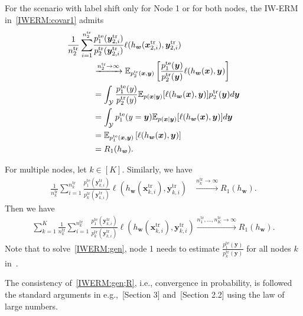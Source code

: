 For the scenario with label shift only for Node 1 or for both nodes, the IW-ERM in~\cref{IWERM:covar1} admits
\begin{align}
\frac{1}{n_2^{\text{tr}}}\sum_{i=1}^{n_2^{\text{tr}}}& \frac{p_1^{\text{te}}(\boldsymbol{y}_{2,i}^{\text{tr}})}{p_2^{\text{tr}}(\boldsymbol{y}_{2,i}^{\text{tr}})}\ell(h_{\boldsymbol{w}}(\boldsymbol{x}_{2,i}^{\text{tr}}),\boldsymbol{y}_{2,i}^{\text{tr}})\\
&\xrightarrow{n_2^{\text{tr}}\rightarrow \infty}
\mathbb{E}_{p_2^{\text{tr}}(\boldsymbol{x},\boldsymbol{y})} \left[\frac{p_1^{\text{te}}(\boldsymbol{y})}{p_2^{\text{tr}}(\boldsymbol{y})}\ell(h_{\boldsymbol{w}}(\boldsymbol{x}),\boldsymbol{y}) \right]\\
&= \int_{\mathcal{Y}}\frac{p_1^{\text{te}}(y)}{p_2^{\text{tr}}(y)}\mathbb{E}_{p(\boldsymbol{x}|\boldsymbol{y})}[\ell(h_{\boldsymbol{w}}(\boldsymbol{x}),\boldsymbol{y})]p_2^{\text{tr}}(\boldsymbol{y}){d}\boldsymbol{y}\\
&= \int_{\mathcal{Y}}p_1^{\text{te}}(y=\boldsymbol{y})\mathbb{E}_{p(\boldsymbol{x}|\boldsymbol{y})}[\ell(h_{\boldsymbol{w}}(\boldsymbol{x}), \boldsymbol{y})]{d}\boldsymbol{y}\\
&= \mathbb{E}_{p_1^{\text{te}}(\boldsymbol{x},\boldsymbol{y})} \left[\ell(h_{\boldsymbol{w}}(\boldsymbol{x}),\boldsymbol{y}) \right]\\
&= R_1(h_{\boldsymbol{w}}). 
\end{align}


For multiple nodes, let $k\in[K]$. Similarly, we have 
\begin{align}
\frac{1}{n_k^{\text{tr}}}\sum_{i=1}^{n_k^{\text{tr}}} \frac{p_1^{\text{te}}(\boldsymbol{y}_{k,i}^{\text{tr}})}{p_k^{\text{tr}}(\boldsymbol{y}_{k,i}^{\text{tr}})}\ell(h_{\boldsymbol{w}}(\boldsymbol{x}_{k,i}^{\text{tr}}),\boldsymbol{y}_{k,i}^{\text{tr}})&\xrightarrow{n_k^{\text{tr}}\rightarrow \infty}
 R_1(h_{\boldsymbol{w}}). 
\end{align}
Then we have 
\begin{align}
    \sum_{k=1}^K \frac{1}{n_k^{\text{tr}}}\sum_{i=1}^{n_k^{\text{tr}}} \frac{p_1^{\text{te}}(\boldsymbol{y}_{k,i}^{\text{tr}})}{p_k^{\text{tr}}(\boldsymbol{y}_{k,i}^{\text{tr}})}\ell(h_{\boldsymbol{w}}(\boldsymbol{x}_{k,i}^{\text{tr}}),\boldsymbol{y}_{k,i}^{\text{tr}})\xrightarrow{n_1^{\text{tr}},\ldots,n_K^{\text{tr}}\rightarrow \infty}
 R_1(h_{\boldsymbol{w}}).
\end{align}
Note that to solve~\cref{IWERM:gen}, node 1 needs to estimate $\frac{p_1^{\text{te}}(\boldsymbol{y})}{p_k^{\text{tr}}(\boldsymbol{y})}$ for all nodes $k$ in~. 


The consistency of~\cref{IWERM:gen;R}, i.e., convergence in probability, is  followed the standard arguments in e.g.,~\citep{shimodaira2000improving}[Section 3] and~\citep{sugiyama2007covariate}[Section 2.2] using the law of large numbers.
